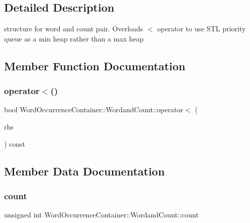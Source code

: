 \subsection{Detailed Description}
structure for word and count pair. Overloads $<$ operator to use S\+TL priority queue as a min heap rather than a max heap 

\subsection{Member Function Documentation}
\mbox{\label{struct_word_occurrence_container_1_1_wordand_count_a6922cc342d2df02f2786a5f1e676c7c0}} 
\subsubsection{\texorpdfstring{operator$<$()}{operator<()}}
{\footnotesize\ttfamily bool Word\+Occurrence\+Container\+::\+Wordand\+Count\+::operator$<$ (\begin{DoxyParamCaption}\item[{const \mbox{\hyperlink{struct_word_occurrence_container_1_1_wordand_count}{Wordand\+Count}} \&}]{rhs }\end{DoxyParamCaption}) const\hspace{0.3cm}{\ttfamily [inline]}}



\subsection{Member Data Documentation}
\mbox{\label{struct_word_occurrence_container_1_1_wordand_count_ad1ee36cdf02e30c4c2de82cd47fc093b}} 
\subsubsection{\texorpdfstring{count}{count}}
{\footnotesize\ttfamily unsigned int Word\+Occurrence\+Container\+::\+Wordand\+Count\+::count}

